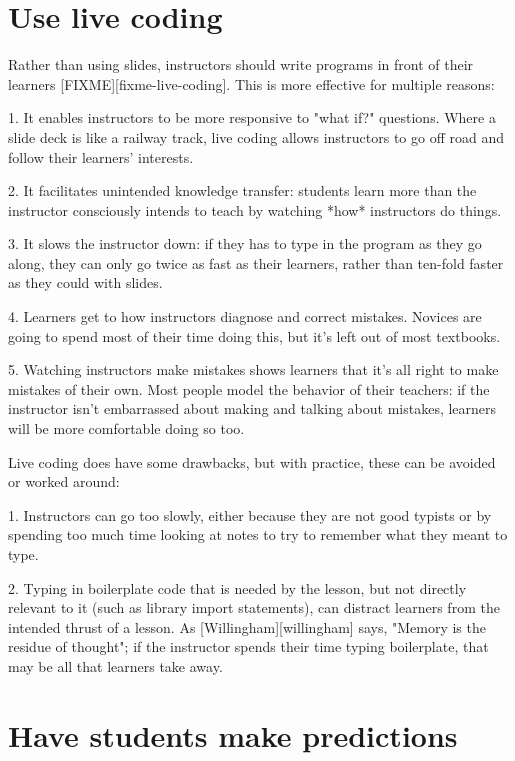 \documentclass{article}
\begin{document}
\section{Use live coding}

Rather than using slides,
instructors should write programs in front of their learners [FIXME][fixme-live-coding].
This is more effective for multiple reasons:

1.  It enables instructors to be more responsive to "what if?"
    questions. Where a slide deck is like a railway track, live coding
    allows instructors to go off road and follow their learners'
    interests.

2.  It facilitates unintended knowledge transfer: students learn more
    than the instructor consciously intends to teach by watching *how*
    instructors do things.

3.  It slows the instructor down: if they has to type in the program
    as they go along, they can only go twice as fast as their
    learners, rather than ten-fold faster as they could with slides.

4.  Learners get to how instructors diagnose and correct
    mistakes. Novices are going to spend most of their time doing
    this, but it's left out of most textbooks.

5.  Watching instructors make mistakes shows learners that it's all
    right to make mistakes of their own.  Most people model the
    behavior of their teachers: if the instructor isn't embarrassed
    about making and talking about mistakes, learners will be more
    comfortable doing so too.

Live coding does have some drawbacks, but with practice, these can be
avoided or worked around:

1.  Instructors can go too slowly, either because they are not good
    typists or by spending too much time looking at notes to try to
    remember what they meant to type.

2.  Typing in boilerplate code that is needed by the lesson, but not
    directly relevant to it (such as library import statements), can
    distract learners from the intended thrust of a lesson.  As
    [Willingham][willingham] says, "Memory is the residue of thought";
    if the instructor spends their time typing boilerplate, that may
    be all that learners take away.

\section{Have students make predictions}
\end{document}
